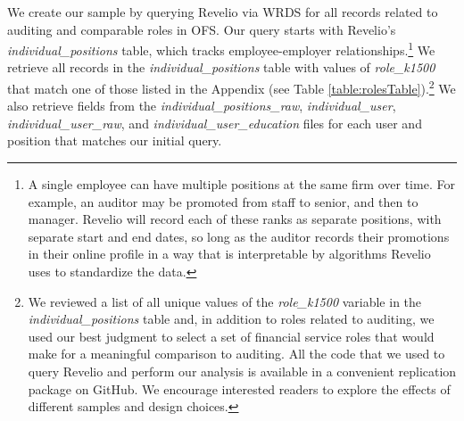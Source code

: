 \documentclass[11pt]{article}
\begin{document}
        We create our sample by querying Revelio via WRDS for all records related to auditing and comparable roles in OFS. Our query starts with Revelio's \textit{individual\_positions} table, which tracks employee-employer relationships.\footnote{A single employee can have multiple positions at the same firm over time. For example, an auditor may be promoted from staff to senior, and then to manager. Revelio will record each of these ranks as separate positions, with separate start and end dates, so long as the auditor records their promotions in their online profile in a way that is interpretable by algorithms Revelio uses to standardize the data.} We retrieve all records in the \textit{individual\_positions} table with values of \textit{role\_k1500} that match one of those listed in the Appendix (see Table \ref{table:rolesTable}).\footnote{We reviewed a list of all unique values of the \textit{role\_k1500} variable in the \textit{individual\_positions} table and, in addition to roles related to auditing, we used our best judgment to select a set of financial service roles that would make for a meaningful comparison to auditing. All the code that we used to query Revelio and perform our analysis is available in a convenient replication package on GitHub. We encourage interested readers to explore the effects of different samples and design choices.} We also retrieve fields from the \textit{individual\_positions\_raw}, \textit{individual\_user}, \textit{individual\_user\_raw}, and \textit{individual\_user\_education} files for each user and position that matches our initial query.
        
\end{document}
